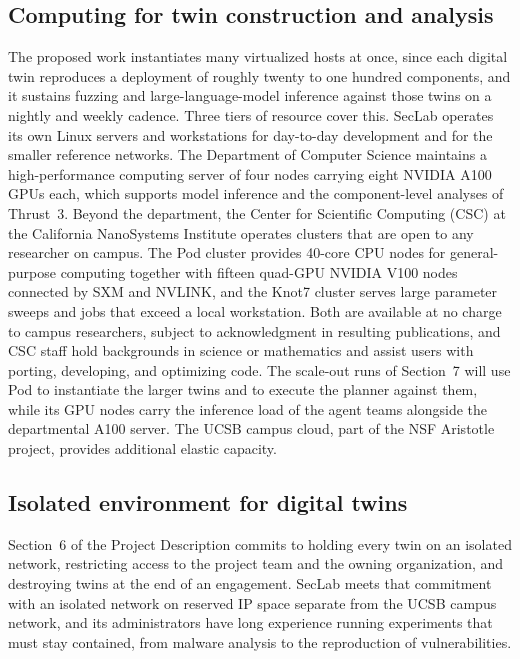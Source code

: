 \documentclass[11pt,letterpaper]{article}
\begin{document}
\subsection{Computing for twin construction and analysis}
The proposed work instantiates many virtualized hosts at once, since each
digital twin reproduces a deployment of roughly twenty to one hundred
components, and it sustains fuzzing and large-language-model inference against
those twins on a nightly and weekly cadence. Three tiers of resource cover
this. SecLab operates its own Linux servers and workstations for day-to-day
development and for the smaller reference networks. The Department of Computer
Science maintains a high-performance computing server of four nodes carrying
eight NVIDIA A100 GPUs each, which supports model inference and the
component-level analyses of Thrust~3. Beyond the department, the Center for
Scientific Computing (CSC) at the California NanoSystems Institute operates
clusters that are open to any researcher on campus. The Pod cluster provides
40-core CPU nodes for general-purpose computing together with fifteen
quad-GPU NVIDIA V100 nodes connected by SXM and NVLINK, and the Knot7 cluster
serves large parameter sweeps and jobs that exceed a local workstation. Both
are available at no charge to campus researchers, subject to acknowledgment in
resulting publications, and CSC staff hold backgrounds in science or
mathematics and assist users with porting, developing, and optimizing code.
The scale-out runs of Section~7 will use Pod to instantiate the larger twins
and to execute the planner against them, while its GPU nodes carry the
inference load of the agent teams alongside the departmental A100 server. The
UCSB campus cloud, part of the NSF Aristotle project, provides additional
elastic capacity.

\subsection{Isolated environment for digital twins}
Section~6 of the Project Description commits to holding every twin on an
isolated network, restricting access to the project team and the owning
organization, and destroying twins at the end of an engagement. SecLab meets
that commitment with an isolated network on reserved IP space separate from the
UCSB campus network, and its administrators have long experience running
experiments that must stay contained, from malware analysis to the
reproduction of vulnerabilities.
\end{document}
